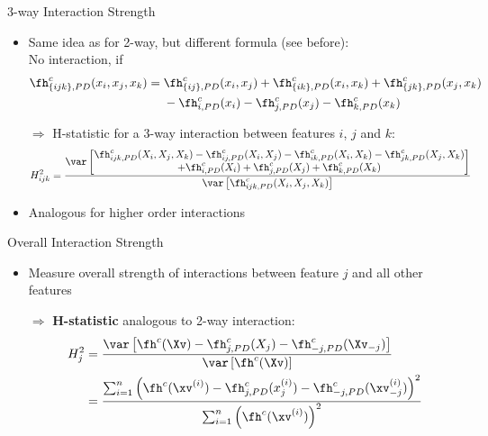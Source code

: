 \documentclass[11pt,compress,t,notes=noshow, aspectratio=169, xcolor=table]{beamer}
\begin{document}
\begin{frame}{3-way Interaction Strength}
\begin{itemize}
    \item Same idea as for 2-way, but different formula (see before): \\
    No interaction, if
    \begin{align*}
        \fh^c_{\{ijk\}, PD}(x_i, x_j, x_k)
        =\; & \fh^c_{\{ij\}, PD}(x_i, x_j) + \fh^c_{\{ik\}, PD}(x_i, x_k) + \fh^c_{\{jk\}, PD}(x_j, x_k) \\
        & - \fh^c_{i, PD}(x_i) - \fh^c_{j, PD}(x_j) - \fh^c_{k, PD}(x_k)
    \end{align*}
    \item[$\Rightarrow$] H-statistic for a 3-way interaction between features $i$, $j$ and $k$:
    \begin{align*}
        H^2_{ijk}
        & = \frac{ \var \left[ \substack{\textstyle
        \fh^c_{ijk, PD}(X_i, X_j, X_k)
        - \fh^c_{ij, PD}(X_i, X_j) - \fh^c_{ik, PD}(X_i, X_k) - \fh^c_{jk, PD}(X_j, X_k) \\ \textstyle
        + \fh^c_{i, PD}(X_i) + \fh^c_{j, PD}(X_j) + \fh^c_{k, PD}(X_k)
        }
        \right]
        }{ \var \left[ \fh^c_{ijk, PD}(X_i, X_j, X_k) \right] }
    \end{align*}
    \item Analogous for higher order interactions
\end{itemize}
\end{frame}



\begin{frame}{Overall Interaction Strength}

\begin{itemize}
    \item Measure overall strength of interactions between feature $j$ and all other features
    \item[$\Rightarrow$] \textbf{H-statistic} analogous to 2-way interaction:
    \begin{align*}
        H^2_{j}
        & = \frac{
            \var \left[ \fh^c(\Xv) - \fh^c_{j, PD}(X_j) - \fh^c_{-j, PD}(\Xv_{-j}) \right]
        }{ \var \left[ \fh^c(\Xv) \right] } \\
        & = \frac{
            \sum_{i=1}^n \left( \fh^c(\xv^{(i)}) - \fh^c_{j, PD}(x_j^{(i)}) - \fh^c_{-j, PD}(\xv_{-j}^{(i)})  \right)^2
        }{
            \sum_{i=1}^n \left( \fh^c(\xv^{(i)}) \right)^2
        }
    \end{align*}
\end{itemize}


\end{frame}
\end{document}
